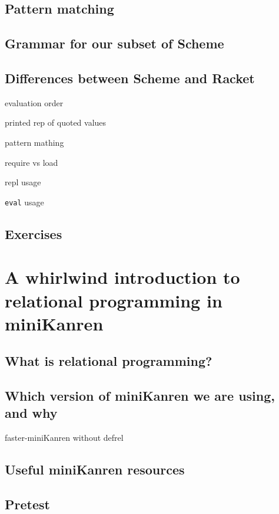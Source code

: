 \documentclass{book}
\begin{document}
\section{Pattern matching}

\section{Grammar for our subset of Scheme}

\section{Differences between Scheme and Racket}

evaluation order

printed rep of quoted values

pattern mathing

require vs load

repl usage

\verb|eval| usage

\section{Exercises}



\chapter{A whirlwind introduction to relational programming in miniKanren}%

\section{What is relational programming?}

\section{Which version of miniKanren we are using, and why}

faster-miniKanren without defrel

\section{Useful miniKanren resources}

\section{Pretest}
\end{document}
